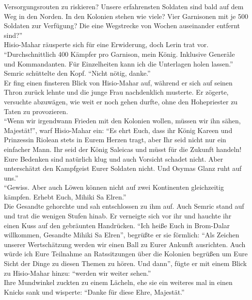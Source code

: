 Versorgungsrouten zu riskieren? Unsere erfahrensten Soldaten sind bald auf dem Weg in den Norden. 
In den Kolonien stehen wie viele? Vier Garnisonen mit je 500 Soldaten zur Verfügung? Die eine 
Wegstrecke von Wochen auseinander entfernt sind?''\\
Hisio-Mahar räusperte sich für eine Erwiderung, doch Lerin trat vor. ``Durchschnittlich 400 Kämpfer 
pro Garnison, mein König. Inklusive Generäle und Kommandanten. Für Einzelheiten kann ich die 
Unterlagen holen lassen.''\\
Semric schüttelte den Kopf. ``Nicht nötig, danke.''\\
Er fing einen finsteren Blick von Hisio-Mahar auf, während er sich auf seinen Thron zurück lehnte 
und die junge Frau nachdenklich musterte. Er zögerte, versuchte abzuwägen, wie weit er noch gehen 
durfte, ohne den Hohepriester zu Taten zu provozieren.\\
``Wenn wir irgendwann Frieden mit den Kolonien wollen, müssen wir ihn sähen, Majestät!'', warf 
Hisio-Mahar ein: ``Es ehrt Euch, dass ihr König Kareen und Prinzessin Riolean stets in Eurem 
Herzen tragt, aber Ihr seid nicht nur ein einfacher Mann. Ihr seid der König Saleicas und müsst für 
die Zukunft handeln! Eure Bedenken sind natürlich klug und auch Vorsicht schadet nicht. Aber 
unterschätzt den Kampfgeist Eurer Soldaten nicht. Und Osymas Glanz ruht auf uns.''\\
``Gewiss. Aber auch Löwen können nicht auf zwei Kontinenten gleichzeitig kämpfen. Erhebt Euch, 
Mihiki Sa Elren.''\\
Die Gesandte gehorchte und sah entschlossen zu ihm auf. Auch Semric stand auf und trat die wenigen 
Stufen hinab. Er verneigte sich vor ihr und hauchte ihr einen Kuss auf den gebräunten Handrücken. 
``Ich heiße Euch in Brom-Dalar willkommen, Gesandte Mihiki Sa Elren'', begrüßte er sie förmlich: 
``Als Zeichen unserer Wertschätzung werden wir einen Ball zu Eurer Ankunft ausrichten. Auch würde 
ich Eure Teilnahme an Ratssitzungen über die Kolonien begrüßen um Eure Sicht der Dinge zu diesen 
Themen zu hören. Und dann'', fügte er mit einem Blick zu Hisio-Mahar hinzu: ``werden wir weiter 
sehen.''\\
Ihre Mundwinkel zuckten zu einem Lächeln, ehe sie ein weiteres mal in einen Knicks sank und 
wisperte: ``Danke für diese Ehre, Majestät.''\\


